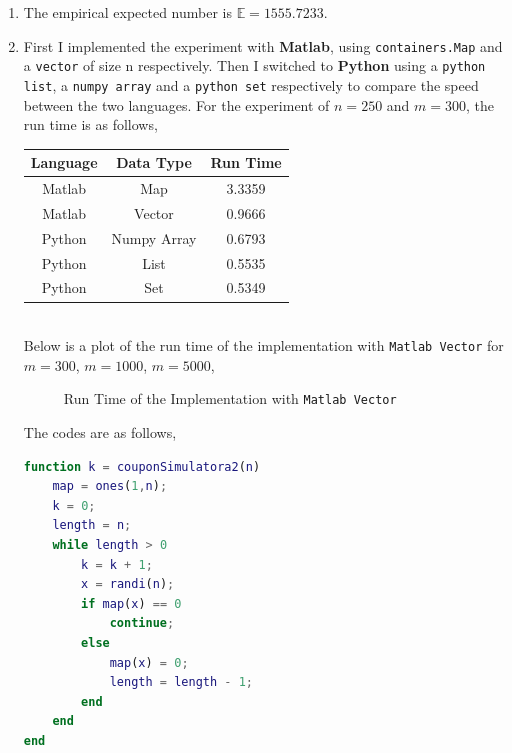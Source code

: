\documentclass[11pt]{article}
\begin{document}
\begin{enumerate}[A]
\item The empirical expected number is $\mathbb{E} = 1555.7233$.
\item First I implemented the experiment with \textbf{Matlab}, using \texttt{containers.Map} and a \texttt{vector} of size n respectively. Then I switched to \textbf{Python} using a \texttt{python list}, a \texttt{numpy array} and a \texttt{python set} respectively to compare the speed between the two languages.
For the experiment of $n=250$ and $m=300$, the run time is as follows,
\begin{table}[h]
\centering
\begin{tabular}{ccc}
Language & Data Type & Run Time\\
\hline
Matlab & Map & 3.3359\\
Matlab & Vector & 0.9666\\
Python & Numpy Array & 0.6793\\
Python & List &  0.5535\\
Python & Set & 0.5349
\end{tabular}
\end{table}\\
Below is a plot of the run time of the implementation with \texttt{Matlab Vector} for $m=300$, $m=1000$, $m=5000$,
\begin{figure}[h]
\caption{Run Time of the Implementation with \texttt{Matlab Vector}}
\label{fig:name}
\end{figure}

\newpage
The codes are as follows,
\begin{lstlisting}[language=Matlab]
function k = couponSimulatora2(n)
    map = ones(1,n);
    k = 0;
    length = n;
    while length > 0
        k = k + 1;
        x = randi(n);
        if map(x) == 0
            continue;
        else
            map(x) = 0;
            length = length - 1;
        end
    end
end
\end{lstlisting}
\end{enumerate}
\end{document}

